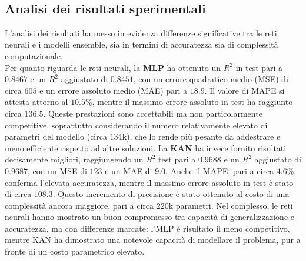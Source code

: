 \documentclass[a4paper,12pt]{report}
\begin{document}
	\begin{verbatim}
		
	\end{verbatim}
	
	\subsection{Analisi dei risultati sperimentali}
	
	L’analisi dei risultati ha messo in evidenza differenze significative tra le reti neurali e i modelli ensemble, sia in termini di accuratezza sia di complessità computazionale. \\
	Per quanto riguarda le reti neurali, la \textbf{MLP} ha ottenuto un $R^2$ in test pari a $0.8467$ e un $R^2$ aggiustato di $0.8451$, con un errore quadratico medio (MSE) di circa $605$ e un errore assoluto medio (MAE) pari a $18.9$. Il valore di MAPE si attesta attorno al $10.5\%$, mentre il massimo errore assoluto in test ha raggiunto circa $136.5$. Queste prestazioni sono accettabili ma non particolarmente competitive, soprattutto considerando il numero relativamente elevato di parametri del modello (circa $134$k), che lo rende più pesante da addestrare e meno efficiente rispetto ad altre soluzioni. La \textbf{KAN} ha invece fornito risultati decisamente migliori, raggiungendo un $R^2$ test pari a $0.9688$ e un $R^2$ aggiustato di $0.9687$, con un MSE di $123$ e un MAE di $9.0$. Anche il MAPE, pari a circa $4.6\%$, conferma l’elevata accuratezza, mentre il massimo errore assoluto in test è stato di circa $108.3$. Questo incremento di precisione è stato ottenuto al costo di una complessità ancora maggiore, pari a circa $220$k parametri. Nel complesso, le reti neurali hanno mostrato un buon compromesso tra capacità di generalizzazione e accuratezza, ma con differenze marcate: l’MLP è risultato il meno competitivo, mentre KAN ha dimostrato una notevole capacità di modellare il problema, pur a fronte di un costo parametrico elevato. \\
\end{document}
